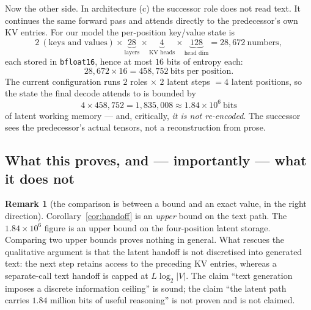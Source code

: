 \documentclass[11pt]{article}
\theoremstyle{definition}
\newtheorem{remark}[theorem]{Remark}
\begin{document}
Now the other side. In architecture (c) the successor role does not read text. It continues the same forward pass and attends directly to the predecessor's own KV entries. For our model the per-position key/value state is
\[
2 \ (\text{keys and values}) \times
\underbrace{28}_{\text{layers}} \times
\underbrace{4}_{\text{KV heads}} \times
\underbrace{128}_{\text{head dim}}
= 28{,}672 \ \text{numbers},
\]
each stored in \texttt{bfloat16}, hence at most $16$ bits of entropy each:
\[
28{,}672 \times 16 = 458{,}752\ \text{bits per position.}
\]
The current configuration runs $2$ roles $\times$ $2$ latent steps $=4$ latent positions, so the state the final decode attends to is bounded by
\[
4 \times 458{,}752 = 1{,}835{,}008 \approx 1.84\times10^{6}\ \text{bits}
\]
of latent working memory --- and, critically, \emph{it is not re-encoded}. The successor sees the predecessor's actual tensors, not a reconstruction from prose.

\begin{center}
\end{center}

\subsection{What this proves, and --- importantly --- what it does not}
\label{sec:honest-capacity}

\begin{remark}[the comparison is between a bound and an exact value, in the right direction]
Corollary~\ref{cor:handoff} is an \emph{upper} bound on the text path. The $1.84\times10^{6}$ figure is an upper bound on the four-position latent storage. Comparing two upper bounds proves nothing in general. What rescues the qualitative argument is that the latent handoff is not discretised into generated text: the next step retains access to the preceding KV entries, whereas a separate-call text handoff is capped at $L\log_2|V|$. The claim ``text generation imposes a discrete information ceiling'' is sound; the claim ``the latent path carries $1.84$ million bits of useful reasoning'' is not proven and is not claimed.
\end{remark}
\end{document}
